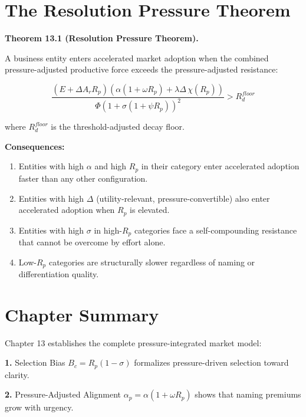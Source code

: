 \documentclass[12pt, openany]{book}
\theoremstyle{thmstyle}
\theoremstyle{defstyle}
\begin{document}
\section{The Resolution Pressure Theorem}

\begin{theorembox}
\textbf{Theorem 13.1 (Resolution Pressure Theorem).}

A business entity enters accelerated market adoption when the combined pressure-adjusted productive force exceeds the pressure-adjusted resistance:

\begin{equation}
\frac{
(E + \Delta A_r R_p)(\alpha(1+\omega R_p) + \lambda\Delta\,\chi(R_p))
}{
\Phi(1+\sigma(1+\psi R_p))^2
}
> R_d^{floor}
\label{eq:rp_theorem}
\end{equation}

where $R_d^{floor}$ is the threshold-adjusted decay floor.

\textbf{Consequences:}

\begin{enumerate}[leftmargin=1.5em]
  \item Entities with high $\alpha$ and high $R_p$ in their category enter accelerated adoption faster than any other configuration.
  \item Entities with high $\Delta$ (utility-relevant, pressure-convertible) also enter accelerated adoption when $R_p$ is elevated.
  \item Entities with high $\sigma$ in high-$R_p$ categories face a self-compounding resistance that cannot be overcome by effort alone.
  \item Low-$R_p$ categories are structurally slower regardless of naming or differentiation quality.
\end{enumerate}
\end{theorembox}

\section{Chapter Summary}

Chapter 13 establishes the complete pressure-integrated market model:

\textbf{1.} Selection Bias $B_c = R_p(1-\sigma)$ formalizes pressure-driven selection toward clarity.

\textbf{2.} Pressure-Adjusted Alignment $\alpha_p = \alpha(1+\omega R_p)$ shows that naming premiums grow with urgency.
\end{document}
